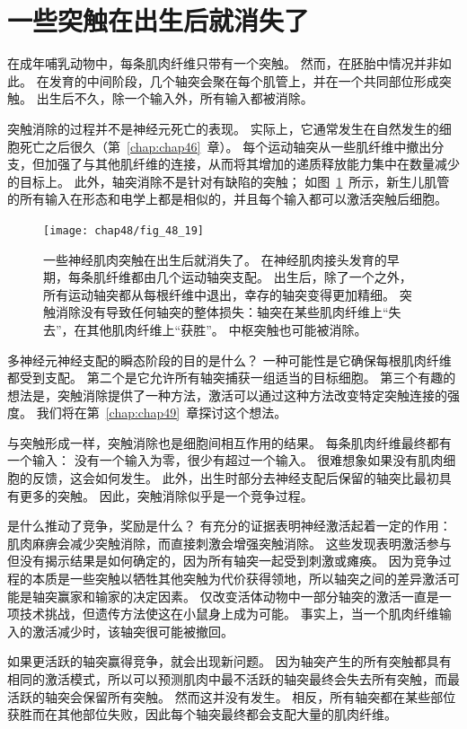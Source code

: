 \section{一些突触在出生后就消失了}

在成年哺乳动物中，每条肌肉纤维只带有一个突触。
然而，在胚胎中情况并非如此。
在发育的中间阶段，几个轴突会聚在每个肌管上，并在一个共同部位形成突触。
出生后不久，除一个输入外，所有输入都被消除。


突触消除的过程并不是神经元死亡的表现。
实际上，它通常发生在自然发生的细胞死亡之后很久（第~\ref{chap:chap46}~章）。
每个运动轴突从一些肌纤维中撤出分支，但加强了与其他肌纤维的连接，从而将其增加的递质释放能力集中在数量减少的目标上。
此外，轴突消除不是针对有缺陷的突触；
如图~\ref{fig:48_19}~所示，新生儿肌管的所有输入在形态和电学上都是相似的，并且每个输入都可以激活突触后细胞。


\begin{figure}[htbp]
	\centering
	\texttt{[image: chap48/fig\_48\_19]}
	\caption{一些神经肌肉突触在出生后就消失了。
		在神经肌肉接头发育的早期，每条肌纤维都由几个运动轴突支配。
		出生后，除了一个之外，所有运动轴突都从每根纤维中退出，幸存的轴突变得更加精细。
		突触消除没有导致任何轴突的整体损失：轴突在某些肌肉纤维上“失去”，在其他肌肉纤维上“获胜”。
		中枢突触也可能被消除。}
	\label{fig:48_19}
\end{figure}


多神经元神经支配的瞬态阶段的目的是什么？
一种可能性是它确保每根肌肉纤维都受到支配。
第二个是它允许所有轴突捕获一组适当的目标细胞。
第三个有趣的想法是，突触消除提供了一种方法，激活可以通过这种方法改变特定突触连接的强度。
我们将在第~\ref{chap:chap49}~章探讨这个想法。


与突触形成一样，突触消除也是细胞间相互作用的结果。
每条肌肉纤维最终都有一个输入：
没有一个输入为零，很少有超过一个输入。
很难想象如果没有肌肉细胞的反馈，这会如何发生。
此外，出生时部分去神经支配后保留的轴突比最初具有更多的突触。
因此，突触消除似乎是一个竞争过程。


是什么推动了竞争，奖励是什么？
有充分的证据表明神经激活起着一定的作用：
肌肉麻痹会减少突触消除，而直接刺激会增强突触消除。
这些发现表明激活参与但没有揭示结果是如何确定的，因为所有轴突一起受到刺激或瘫痪。
因为竞争过程的本质是一些突触以牺牲其他突触为代价获得领地，所以轴突之间的差异激活可能是轴突赢家和输家的决定因素。
仅改变活体动物中一部分轴突的激活一直是一项技术挑战，但遗传方法使这在小鼠身上成为可能。
事实上，当一个肌肉纤维输入的激活减少时，该轴突很可能被撤回。


如果更活跃的轴突赢得竞争，就会出现新问题。
因为轴突产生的所有突触都具有相同的激活模式，所以可以预测肌肉中最不活跃的轴突最终会失去所有突触，而最活跃的轴突会保留所有突触。
然而这并没有发生。
相反，所有轴突都在某些部位获胜而在其他部位失败，因此每个轴突最终都会支配大量的肌肉纤维。


